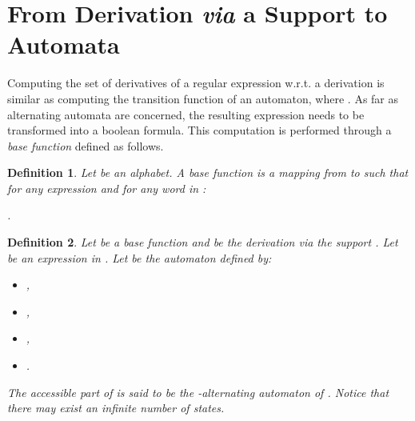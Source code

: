 \documentclass{article}
\newtheorem{definition}{Definition}
\begin{document}
\section{From Derivation \emph{via} a Support to Automata}\label{sec from der to aut}

  Computing the set of derivatives of a regular expression  w.r.t. a derivation  is similar as computing the transition function  of an automaton, where . As far as alternating automata are concerned, the resulting expression  needs to be transformed into a boolean formula. This computation is performed through a \emph{base function} defined as follows.
  
  
  \begin{definition}\label{def base}
    Let  be an alphabet. A \emph{base function}  is a mapping from  to  such that for any expression  and for any word  in :
    
    \centerline{  .}
  \end{definition}
  
  \begin{definition}
    Let  be a base function and  be the derivation \emph{via} the support . Let  be an expression in . Let  be the automaton defined by:
    
    \begin{itemize}
      \item ,
      \item ,
      \item , 
        
      \item .
    \end{itemize}
    
    The accessible part of  is said to be the -\emph{alternating automaton of} . Notice that there may exist an infinite number of states.
  \end{definition}
  
\end{document}
